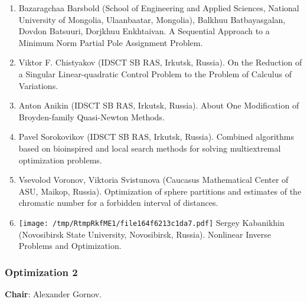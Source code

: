 \documentclass[
]{article}
\providecommand{\tightlist}{%
  \setlength{\itemsep}{0pt}\setlength{\parskip}{0pt}}
\begin{document}
\begin{enumerate}
\def\labelenumi{\arabic{enumi}.}
\tightlist
\item
  Bazaragchaa Barsbold (School of Engineering and Applied Sciences,
  National University of Mongolia, Ulaanbaatar, Mongolia), Balkhuu
  Batbayasgalan, Dovdon Batsuuri, Dorjkhuu Enkhtaivan. A Sequential
  Approach to a Minimum Norm Partial Pole Assignment Problem.
\item
  Viktor F. Chistyakov (IDSCT SB RAS, Irkutsk, Russia). On the Reduction
  of a Singular Linear-quadratic Control Problem to the Problem of
  Calculus of Variations.
\item
  Anton Anikin (IDSCT SB RAS, Irkutsk, Russia). About One Modification
  of Broyden-family Quasi-Newton Methods.
\item
  Pavel Sorokovikov (IDSCT SB RAS, Irkutsk, Russia). Combined algorithms
  based on bioinspired and local search methods for solving
  multiextremal optimization problems.
\item
  Vsevolod Voronov, Viktoria Svistunova (Caucasus Mathematical Center of
  ASU, Maikop, Russia). Optimization of sphere partitions and estimates
  of the chromatic number for a forbidden interval of distances.
\item
  \protect\texttt{[image: /tmp/RtmpRkfME1/file164f6213c1da7.pdf]}
  Sergey Kabanikhin (Novosibirsk State University, Novosibirsk, Russia).
  Nonlinear Inverse Problems and Optimization.
\end{enumerate}

\hypertarget{o2}{%
\subsubsection{Optimization 2}\label{o2}}

\textbf{Chair}: Alexander Gornov.
\end{document}
